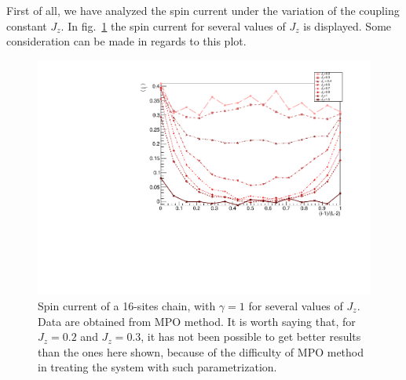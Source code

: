 First of all, we have analyzed the spin current under the variation of the coupling constant $J_z$. In fig.~\ref{fig:16sites_SpinCurrVaryingJz} the spin current for several values of $J_z$ is displayed. Some consideration can be made in regards to this plot.




\begin{figure}[H]
    \centering
    \includegraphics[scale=0.75]{Figures/16sites/16sites_SpinCurrVaryingJz.pdf}
    \captionsetup{width=1.\linewidth}
    \caption{Spin current of a 16-sites chain, with $\gamma = 1$ for several values of $J_z$. Data are obtained from MPO method. It is worth saying that, for $J_z=0.2$ and $J_z=0.3$, it has not been possible to get better results than the ones here shown, because of the difficulty of MPO method in treating the system with such parametrization.}
    \label{fig:16sites_SpinCurrVaryingJz}
\end{figure}

